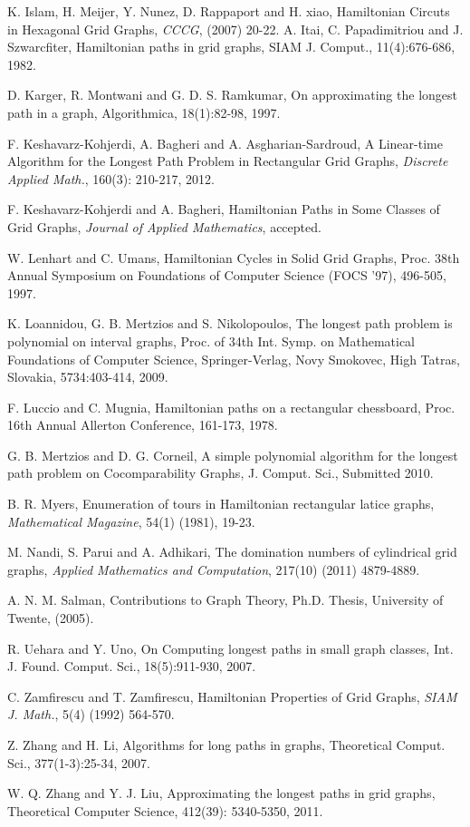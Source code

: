 \documentclass[preprint,12pt]{elsarticle}
\begin{document}
\begin{thebibliography}{00}
{K. Islam, H. Meijer, Y. Nunez, D. Rappaport and H. xiao,
Hamiltonian Circuts in Hexagonal Grid Graphs, \em CCCG}, (2007)
20-22.
A. Itai, C. Papadimitriou and J. Szwarcfiter, Hamiltonian paths in
grid graphs, SIAM J. Comput., 11(4):676-686, 1982.


D. Karger, R. Montwani and G. D. S. Ramkumar, On approximating the
longest path in a graph,  Algorithmica, 18(1):82-98, 1997.

F. Keshavarz-Kohjerdi, A. Bagheri and A. Asgharian-Sardroud, A
Linear-time Algorithm for the Longest Path Problem in Rectangular
Grid Graphs, {\em Discrete Applied Math.}, 160(3): 210-217, 2012.

{F. Keshavarz-Kohjerdi and A. Bagheri, Hamiltonian Paths in Some
Classes of Grid Graphs},  {\em Journal of Applied Mathematics}, accepted.

W. Lenhart and C. Umans, Hamiltonian Cycles in Solid Grid Graphs,
Proc. 38th Annual Symposium on Foundations of Computer Science (FOCS
'97), 496-505, 1997.

K. Loannidou, G. B. Mertzios and S. Nikolopoulos, The longest path
problem is polynomial on interval graphs, Proc. of 34th Int. Symp.
on Mathematical Foundations of Computer Science, Springer-Verlag,
Novy Smokovec, High Tatras, Slovakia, 5734:403-414, 2009.

F. Luccio and C. Mugnia, Hamiltonian paths on a rectangular
chessboard, Proc. 16th Annual Allerton Conference, 161-173, 1978.

G. B. Mertzios and D. G. Corneil, A simple polynomial algorithm for
the longest path problem on Cocomparability Graphs, J. Comput. Sci.,
Submitted 2010.

{B. R. Myers, Enumeration of tours in Hamiltonian rectangular latice
graphs, \em Mathematical Magazine}, 54(1) (1981), 19-23.

{M. Nandi, S. Parui and A. Adhikari, The domination numbers of
cylindrical grid graphs, \em Applied Mathematics and Computation},
217(10) (2011) 4879-4889.

A. N. M. Salman, Contributions to Graph Theory, Ph.D. Thesis,
University of Twente, (2005).

R. Uehara and Y. Uno, On Computing longest paths in small graph
classes, Int. J. Found. Comput. Sci., 18(5):911-930, 2007.

C. Zamfirescu and T. Zamfirescu, Hamiltonian Properties of Grid
Graphs, {\em  SIAM J. Math.}, 5(4) (1992) 564-570.

Z. Zhang and H. Li, Algorithms for long paths in graphs, Theoretical
Comput. Sci., 377(1-3):25-34, 2007.

W. Q. Zhang and Y. J. Liu, Approximating the longest paths in grid
graphs, Theoretical Computer Science, 412(39): 5340-5350, 2011.

\end{thebibliography}
\end{document}
